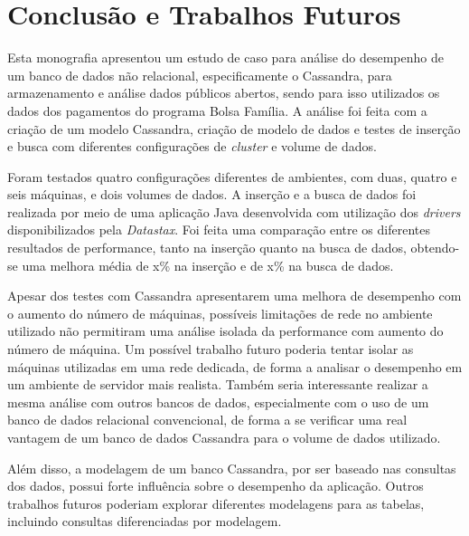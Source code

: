 \chapter{Conclusão e Trabalhos Futuros}

Esta monografia apresentou um estudo de caso para análise do desempenho de um banco de dados não relacional, especificamente o Cassandra, para armazenamento e análise dados públicos abertos, sendo para isso utilizados os dados dos pagamentos do programa Bolsa Família. A análise foi feita com a criação de um modelo Cassandra, criação de modelo de dados e testes de inserção e busca com diferentes configurações de \emph{cluster} e volume de dados.

Foram testados quatro configurações diferentes de ambientes, com duas, quatro e seis máquinas, e dois volumes de dados. A inserção e a busca de dados foi realizada por meio de uma aplicação Java desenvolvida com utilização dos \emph{drivers} disponibilizados pela \emph{Datastax}. Foi feita uma comparação entre os diferentes resultados de performance, tanto na inserção quanto na busca de dados, obtendo-se uma melhora média de x\% na inserção e de x\% na busca de dados.

Apesar dos testes com Cassandra apresentarem uma melhora de desempenho com o aumento do número de máquinas, possíveis limitações de rede no ambiente utilizado não permitiram uma análise isolada da performance com aumento do número de máquina. Um possível trabalho futuro poderia tentar isolar as máquinas utilizadas em uma rede dedicada, de forma a analisar o desempenho em um ambiente de servidor mais realista. Também seria interessante realizar a mesma análise com outros bancos de dados, especialmente com o uso de um banco de dados relacional convencional, de forma a se verificar uma real vantagem de um banco de dados Cassandra para o volume de dados utilizado.

Além disso, a modelagem de um banco Cassandra, por ser baseado nas consultas dos dados, possui forte influência sobre o desempenho da aplicação. Outros trabalhos futuros poderiam explorar diferentes modelagens para as tabelas, incluindo consultas diferenciadas por modelagem.